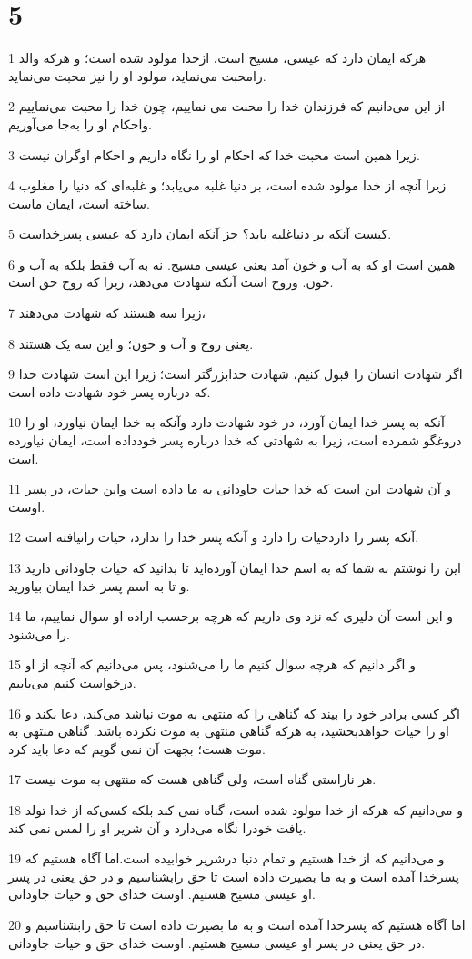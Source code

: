 \chapter{5}

\par 1 هرکه ایمان دارد که عیسی، مسیح است، ازخدا مولود شده است؛ و هرکه والد رامحبت می‌نماید، مولود او را نیز محبت می‌نماید.
\par 2 از این می‌دانیم که فرزندان خدا را محبت می نماییم، چون خدا را محبت می‌نماییم واحکام او را به‌جا می‌آوریم.
\par 3 زیرا همین است محبت خدا که احکام او را نگاه داریم و احکام اوگران نیست.
\par 4 زیرا آنچه از خدا مولود شده است، بر دنیا غلبه می‌یابد؛ و غلبه‌ای که دنیا را مغلوب ساخته است، ایمان ماست.
\par 5 کیست آنکه بر دنیاغلبه یابد؟ جز آنکه ایمان دارد که عیسی پسرخداست.
\par 6 همین است او که به آب و خون آمد یعنی عیسی مسیح. نه به آب فقط بلکه به آب و خون. وروح است آنکه شهادت می‌دهد، زیرا که روح حق است.
\par 7 زیرا سه هستند که شهادت می‌دهند،
\par 8 یعنی روح و آب و خون؛ و این سه یک هستند.
\par 9 اگر شهادت انسان را قبول کنیم، شهادت خدابزرگتر است؛ زیرا این است شهادت خدا که درباره پسر خود شهادت داده است.
\par 10 آنکه به پسر خدا ایمان آورد، در خود شهادت دارد وآنکه به خدا ایمان نیاورد، او را دروغگو شمرده است، زیرا به شهادتی که خدا درباره پسر خودداده است، ایمان نیاورده است.
\par 11 و آن شهادت این است که خدا حیات جاودانی به ما داده است واین حیات، در پسر اوست.
\par 12 آنکه پسر را داردحیات را دارد و آنکه پسر خدا را ندارد، حیات رانیافته است.
\par 13 این را نوشتم به شما که به اسم خدا ایمان آورده‌اید تا بدانید که حیات جاودانی دارید و تا به اسم پسر خدا ایمان بیاورید.
\par 14 و این است آن دلیری که نزد وی داریم که هرچه برحسب اراده او سوال نماییم، ما را می‌شنود.
\par 15 و اگر دانیم که هرچه سوال کنیم ما را می‌شنود، پس می‌دانیم که آنچه از او درخواست کنیم می‌یابیم.
\par 16 اگر کسی برادر خود را بیند که گناهی را که منتهی به موت نباشد می‌کند، دعا بکند و او را حیات خواهدبخشید، به هرکه گناهی منتهی به موت نکرده باشد. گناهی منتهی به موت هست؛ بجهت آن نمی گویم که دعا باید کرد.
\par 17 هر ناراستی گناه است، ولی گناهی هست که منتهی به موت نیست.
\par 18 و می‌دانیم که هرکه از خدا مولود شده است، گناه نمی کند بلکه کسی‌که از خدا تولد یافت خودرا نگاه می‌دارد و آن شریر او را لمس نمی کند.
\par 19 و می‌دانیم که از خدا هستیم و تمام دنیا درشریر خوابیده است.اما آگاه هستیم که پسرخدا آمده است و به ما بصیرت داده است تا حق رابشناسیم و در حق یعنی در پسر او عیسی مسیح هستیم. اوست خدای حق و حیات جاودانی.
\par 20 اما آگاه هستیم که پسرخدا آمده است و به ما بصیرت داده است تا حق رابشناسیم و در حق یعنی در پسر او عیسی مسیح هستیم. اوست خدای حق و حیات جاودانی.



